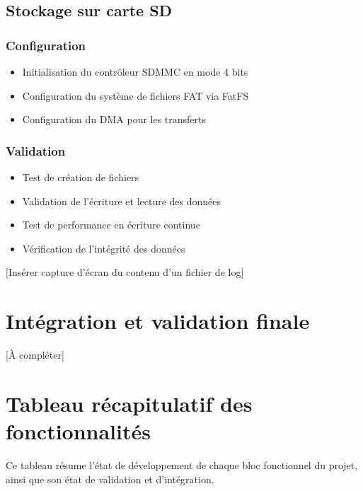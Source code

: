 \documentclass[12pt]{article}
\begin{document}
\subsection{Stockage sur carte SD}
\subsubsection{Configuration}
\begin{itemize}
    \item Initialisation du contrôleur SDMMC en mode 4 bits
    \item Configuration du système de fichiers FAT via FatFS
    \item Configuration du DMA pour les transferts
\end{itemize}

\subsubsection{Validation}
\begin{itemize}
    \item Test de création de fichiers
    \item Validation de l'écriture et lecture des données
    \item Test de performance en écriture continue
    \item Vérification de l'intégrité des données
\end{itemize}

[Insérer capture d'écran du contenu d'un fichier de log]


\section{Intégration et validation finale}
[À compléter]

\section{Tableau récapitulatif des fonctionnalités}

Ce tableau résume l'état de développement de chaque bloc fonctionnel du projet, ainsi que son état de validation et d'intégration.
\end{document}
